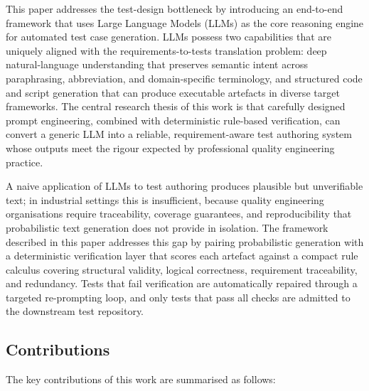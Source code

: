 \documentclass[conference]{IEEEtran}
\begin{document}
This paper addresses the test-design bottleneck by introducing an end-to-end framework that uses Large Language Models (LLMs) as the core reasoning engine for automated test case generation. LLMs possess two capabilities that are uniquely aligned with the requirements-to-tests translation problem: deep natural-language understanding that preserves semantic intent across paraphrasing, abbreviation, and domain-specific terminology, and structured code and script generation that can produce executable artefacts in diverse target frameworks. The central research thesis of this work is that carefully designed prompt engineering, combined with deterministic rule-based verification, can convert a generic LLM into a reliable, requirement-aware test authoring system whose outputs meet the rigour expected by professional quality engineering practice.

A naive application of LLMs to test authoring produces plausible but unverifiable text; in industrial settings this is insufficient, because quality engineering organisations require traceability, coverage guarantees, and reproducibility that probabilistic text generation does not provide in isolation. The framework described in this paper addresses this gap by pairing probabilistic generation with a deterministic verification layer that scores each artefact against a compact rule calculus covering structural validity, logical correctness, requirement traceability, and redundancy. Tests that fail verification are automatically repaired through a targeted re-prompting loop, and only tests that pass all checks are admitted to the downstream test repository.

\subsection{Contributions}

The key contributions of this work are summarised as follows:
\end{document}
